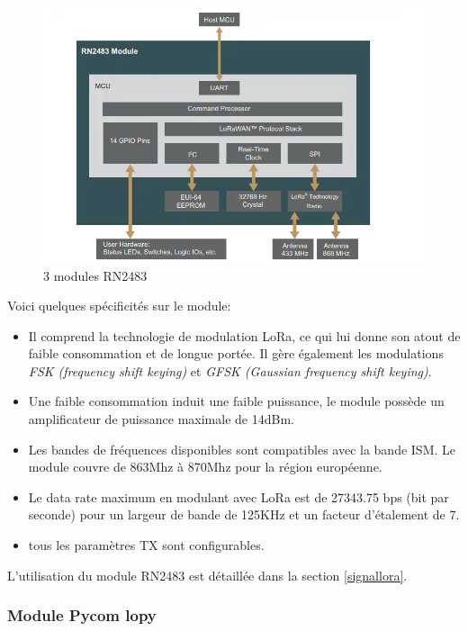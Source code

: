 \begin{figure}[h]
\centering

\includegraphics[scale=0.8]{images/SBrn2483.png}
\caption{3 modules RN2483}\label{term3002}
\end{figure}


Voici quelques spécificités sur le module:
\vspace{0.1cm}

\begin{itemize}
\item Il comprend la technologie de modulation LoRa, ce qui lui donne son atout de faible consommation et de longue portée. Il gère également les modulations \textit{FSK (frequency shift keying)} et \textit{GFSK (Gaussian frequency shift keying)}.
\item Une faible consommation induit une faible puissance, le module possède un amplificateur de puissance maximale de 14dBm.
\item Les bandes de fréquences disponibles sont compatibles avec la bande ISM. Le module couvre de 863Mhz à 870Mhz pour la région européenne.
\item Le data rate maximum en modulant avec LoRa est de 27343.75 bps (bit par seconde) pour un largeur de bande de 125KHz et un facteur d'étalement de 7.
\item tous les paramètres TX sont configurables.
\end{itemize}

\vspace{0.1cm}

L'utilisation du module RN2483 est détaillée dans la section \ref{signallora}.

\subsubsection{Module Pycom lopy}

